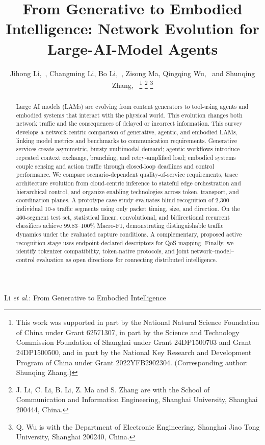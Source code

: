 \documentclass[letterpaper,journal]{IEEEtran}
\begin{document}
\title{\fontsize{24}{28}\selectfont From Generative to Embodied Intelligence: Network Evolution for Large-AI-Model Agents}

\author{Jihong Li,~, Changming Li, Bo Li,~, Zisong Ma, 
Qingqing Wu,~
and Shunqing Zhang,~%
\thanks{This work was supported in part by the National Natural Science Foundation of China under Grant 62571307, in part by the Science and Technology Commission Foundation of Shanghai under Grant 24DP1500703 and Grant 24DP1500500, and in part by the National Key Research and Development Program of China under Grant 2022YFB2902304. (Corresponding author: Shunqing Zhang.)}
\thanks{J. Li, C. Li, B. Li, Z. Ma and S. Zhang are with the School of Communication and
Information Engineering, Shanghai University, Shanghai 200444, China.
}
\thanks{Q. Wu is with the Department of Electronic Engineering, Shanghai Jiao Tong
University, Shanghai 200240, China. }}

%
{Li \MakeLowercase{\textit{et al.}}: From Generative to Embodied Intelligence}

\maketitle

\begin{abstract}
Large AI models (LAMs) are evolving from content generators to tool-using
agents and embodied systems that interact with the physical world. This
evolution changes both network traffic and the consequences of delayed or
incorrect information. This survey develops a network-centric comparison of
generative, agentic, and embodied LAMs, linking model metrics and benchmarks
to communication requirements. Generative services create asymmetric,
bursty multimodal demand; agentic workflows introduce repeated context
exchange, branching, and retry-amplified load; embodied systems couple
sensing and action traffic through closed-loop deadlines and control
performance. We compare scenario-dependent quality-of-service requirements,
trace architecture evolution from cloud-centric inference to stateful edge
orchestration and hierarchical control, and organize enabling technologies
across token, transport, and coordination planes. A prototype case study
evaluates blind recognition of 2,300 individual 10-s traffic segments using
only packet timing, size, and direction. On the 460-segment test set,
statistical linear, convolutional, and bidirectional recurrent classifiers
achieve 99.83--100\% Macro-F1, demonstrating distinguishable traffic dynamics
under the evaluated capture conditions. A complementary, proposed active
recognition stage uses endpoint-declared descriptors for QoS mapping.
Finally, we identify tokenizer compatibility, token-native protocols, and
joint network--model--control evaluation as open directions for connecting
distributed intelligence.
\end{abstract}
\end{document}
